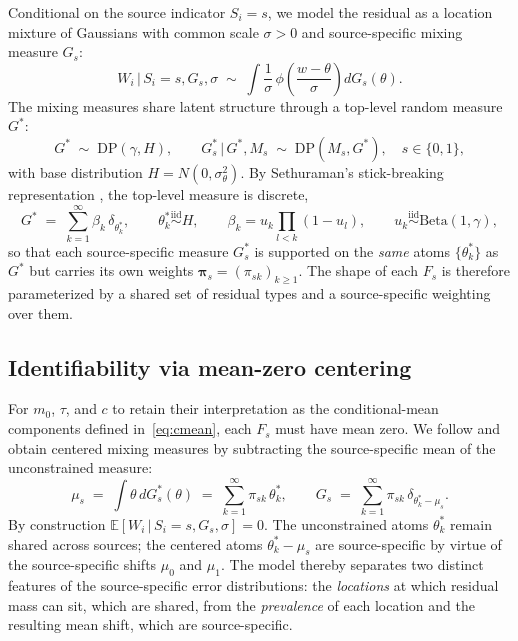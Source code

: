 \documentclass[11pt]{article}
\theoremstyle{plain}
\theoremstyle{definition}
\theoremstyle{remark}
\newcommand{\E}{\mathbb{E}}
\newcommand{\1}{\mathds{1}}
\newcommand{\given}{\,|\,}
\begin{document}
Conditional on the source indicator $S_i = s$, we model the residual as a location mixture of Gaussians with common scale $\sigma > 0$ and source-specific mixing measure $G_s$:
\begin{equation}
W_i \given S_i = s, G_s, \sigma \;\sim\; \int \frac{1}{\sigma}\, \phi\!\left(\frac{w - \theta}{\sigma}\right) dG_s(\theta).
\label{eq:hdp-fs}
\end{equation}
The mixing measures share latent structure through a top-level random measure $G^*$:
\begin{equation}
G^* \;\sim\; \mathrm{DP}(\gamma, H), \qquad
G_s^* \given G^*, M_s \;\sim\; \mathrm{DP}(M_s, G^*), \quad s \in \{0, 1\},
\label{eq:hdp-prior}
\end{equation}
with base distribution $H = N(0, \sigma_\theta^2)$. By Sethuraman's stick-breaking representation \citep{sethuraman1994constructive}, the top-level measure is discrete,
\begin{equation}
G^* \;=\; \sum_{k=1}^\infty \beta_k\, \delta_{\theta_k^*}, \qquad \theta_k^* \stackrel{\mathrm{iid}}{\sim} H, \qquad \beta_k = u_k \prod_{l < k}(1 - u_l), \qquad u_k \stackrel{\mathrm{iid}}{\sim} \mathrm{Beta}(1, \gamma),
\end{equation}
so that each source-specific measure $G_s^*$ is supported on the \emph{same} atoms $\{\theta_k^*\}$ as $G^*$ but carries its own weights $\bm{\pi}_s = (\pi_{sk})_{k \ge 1}$. The shape of each $F_s$ is therefore parameterized by a shared set of residual types and a source-specific weighting over them.

\subsection{Identifiability via mean-zero centering}
\label{sec:hdp-centering}

For $m_0$, $\tau$, and $c$ to retain their interpretation as the conditional-mean components defined in~\eqref{eq:cmean}, each $F_s$ must have mean zero. We follow \citet{yang2010semiparametric} and obtain centered mixing measures by subtracting the source-specific mean of the unconstrained measure:
\begin{equation}
\mu_s \;=\; \int \theta \, dG_s^*(\theta) \;=\; \sum_{k=1}^\infty \pi_{sk}\, \theta_k^*, \qquad
G_s \;=\; \sum_{k=1}^\infty \pi_{sk}\, \delta_{\theta_k^* - \mu_s}.
\label{eq:hdp-centering}
\end{equation}
By construction $\E[W_i \given S_i = s, G_s, \sigma] = 0$. The unconstrained atoms $\theta_k^*$ remain shared across sources; the centered atoms $\theta_k^* - \mu_s$ are source-specific by virtue of the source-specific shifts $\mu_0$ and $\mu_1$. The model thereby separates two distinct features of the source-specific error distributions: the \emph{locations} at which residual mass can sit, which are shared, from the \emph{prevalence} of each location and the resulting mean shift, which are source-specific.
\end{document}
